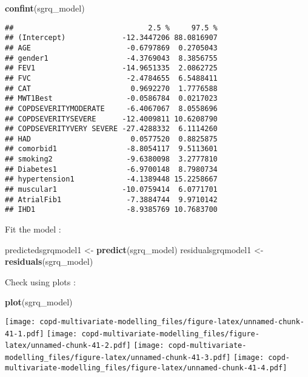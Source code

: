 \documentclass[
]{article}
\newenvironment{Shaded}{\begin{snugshade}}{\end{snugshade}}
\newcommand{\FunctionTok}[1]{\textcolor[rgb]{0.13,0.29,0.53}{\textbf{#1}}}
\newcommand{\NormalTok}[1]{#1}
\newcommand{\OtherTok}[1]{\textcolor[rgb]{0.56,0.35,0.01}{#1}}
\begin{document}
\begin{Shaded}
\begin{Highlighting}[]
\FunctionTok{confint}\NormalTok{(sgrq\_model)}
\end{Highlighting}
\end{Shaded}

\begin{verbatim}
##                               2.5 %     97.5 %
## (Intercept)             -12.3447206 88.0816907
## AGE                      -0.6797869  0.2705043
## gender1                  -4.3769043  8.3856755
## FEV1                    -14.9651335  2.0862725
## FVC                      -2.4784655  6.5488411
## CAT                       0.9692270  1.7776588
## MWT1Best                 -0.0586784  0.0217023
## COPDSEVERITYMODERATE     -6.4067067  8.0558696
## COPDSEVERITYSEVERE      -12.4009811 10.6208790
## COPDSEVERITYVERY SEVERE -27.4288332  6.1114260
## HAD                       0.0577520  0.8825875
## comorbid1                -8.8054117  9.5113601
## smoking2                 -9.6380098  3.2777810
## Diabetes1                -6.9700148  8.7980734
## hypertension1            -4.1389448 15.2258667
## muscular1               -10.0759414  6.0771701
## AtrialFib1               -7.3884744  9.9710142
## IHD1                     -8.9385769 10.7683700
\end{verbatim}

Fit the model :

\begin{Shaded}
\begin{Highlighting}[]
\NormalTok{predictedsgrqmodel1 }\OtherTok{\textless{}{-}} \FunctionTok{predict}\NormalTok{(sgrq\_model)}
\NormalTok{residualsgrqmodel1 }\OtherTok{\textless{}{-}} \FunctionTok{residuals}\NormalTok{(sgrq\_model)}
\end{Highlighting}
\end{Shaded}

Check using plots :

\begin{Shaded}
\begin{Highlighting}[]
\FunctionTok{plot}\NormalTok{(sgrq\_model)}
\end{Highlighting}
\end{Shaded}

\texttt{[image: copd-multivariate-modelling\_files/figure-latex/unnamed-chunk-41-1.pdf]}
\texttt{[image: copd-multivariate-modelling\_files/figure-latex/unnamed-chunk-41-2.pdf]}
\texttt{[image: copd-multivariate-modelling\_files/figure-latex/unnamed-chunk-41-3.pdf]}
\texttt{[image: copd-multivariate-modelling\_files/figure-latex/unnamed-chunk-41-4.pdf]}
\end{document}
